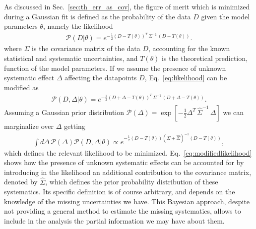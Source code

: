 %
As discussed in Sec.~\ref{sec:th_err_as_cov}, the figure of merit which is minimized during a Gaussian fit is defined 
as the probability of the data $D$ given the model parameters $\theta$, namely the likelihood
\begin{align}
    \label{eq:likelihood}
    \mathcal{P}\left(D|\theta\right) = e^{-\frac{1}{2}\left(D-T\left(\theta\right)\right)^T\,
    \Sigma^{-1}\,\left(D-T\left(\theta\right)\right)}.
\end{align}
where $\Sigma$ is the covariance matrix of the data $D$, accounting for the known
statistical and systematic uncertainties, and $T\left(\theta\right)$ is the theoretical prediction,
function of the model parameters.
If we assume the presence of unknown systematic effect $\Delta$ affecting the datapoints $D$, Eq.~\eqref{eq:likelihood}
can be modified as
\begin{align}
    \mathcal{P}\left(D,\Delta|\theta\right) = 
    e^{-\frac{1}{2}\left(D+\Delta-T\left(\theta\right)\right)^T\,
    \Sigma^{-1}\,\left(D+\Delta-T\left(\theta\right)\right)}.
\end{align}
Assuming a Gaussian prior distribution 
$\mathcal{P}\left(\Delta\right) = \exp\left[-\frac{1}{2}\Delta^T\,\hat{\Sigma}^{-1}\,\Delta\right]$
we can marginalize over $\Delta$ getting
\begin{align}
    \label{eq:modifiedlikelihood}
    \int d\Delta\,\mathcal{P}\left(\Delta\right) \mathcal{P}\left(D,\Delta|\theta\right)   
    \propto 
    e^{-\frac{1}{2}\left(D-T\left(\theta\right)\right)\left(\Sigma+\hat{\Sigma}\right)^{-1}\left(D-T\left(\theta\right)\right)},
\end{align}
which defines the relevant likelihood to be minimized.
Eq.~\eqref{eq:modifiedlikelihood} shows how the presence of unknown systematic effects can be accounted for by 
introducing in the likelihood an additional contribution to the covariance matrix, denoted by $\hat{\Sigma}$, 
which defines the prior probability distribution of these systematics. Its specific definition is of course arbitrary,
and depends on the knowledge of the missing uncertainties we have.
This Bayesian approach, despite not providing a general method 
to estimate the missing systematics, allows to include in the analysis the partial information we may have about them.

